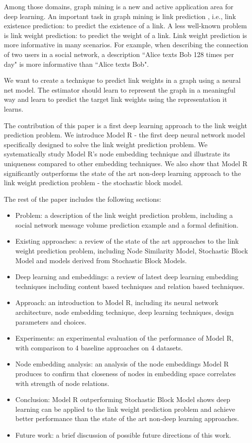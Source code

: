 \documentclass[11pt,twocolumn]{article}
\begin{document}
Among those domains,
graph mining is a new and active application area for deep learning.
An important task in graph mining is link prediction \cite{liben2007link} 
\cite{al2006link}, i.e., link existence prediction:
to predict the existence of a link.
A less well-known problem is link weight prediction: to predict the weight of a link.
Link weight prediction is more informative in many scenarios.
For example, when describing the connection of two users in a social network,
a description ``Alice texts Bob 128 times per day" is more informative than
``Alice texts Bob".

We want to create a technique to predict link weights in a graph using a 
neural net model.
The estimator should learn to represent the graph in a meaningful way and learn to predict the target link weights using the representation it learns.

The contribution of this paper is
a first deep learning approach to the link weight prediction problem.
We introduce Model R - the first deep neural network model specifically designed to solve the link weight prediction problem.
We systematically study Model R's node embedding technique and illustrate its uniqueness compared to other embedding techniques.
We also show that Model R significantly outperforms the state of the art non-deep learning approach to the link weight prediction problem - the stochastic block model.

The rest of the paper includes the following sections:
\begin{itemize}
	\item Problem: a description of the link weight prediction problem, including a social network message volume prediction example and a formal definition.
	\item Existing approaches: a review of the state of the art approaches to the link weight prediction problem, including Node Similarity Model, Stochastic Block Model and models derived from Stochastic Block Models.
	\item Deep learning and embeddings: a review of latest deep learning embedding techniques including content based techniques and relation based techniques.
	\item Approach: an introduction to Model R, including its neural network architecture, node embedding technique, deep learning techniques, design parameters and choices.
	\item Experiments: an experimental evaluation of the performance of Model R, with comparison to 4 baseline approaches on 4 datasets.
	\item Node embedding analysis: an analysis of the node embeddings Model R produces to confirm that closeness of nodes in embedding space correlates with strength of node relations.
	\item Conclusion: Model R outperforming Stochastic Block Model shows deep learning can be applied to the link weight prediction problem and achieve better performance than the state of the art non-deep learning approaches.
	\item Future work: a brief discussion of possible future directions of this work.
\end{itemize}
\end{document}
